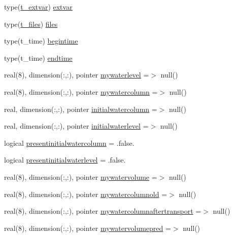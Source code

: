 \begin{DoxyCompactItemize}
type(\mbox{\hyperlink{structmodulerunoff_1_1t__extvar}{t\+\_\+extvar}}) \mbox{\hyperlink{structmodulerunoff_1_1t__runoff_af05a5e839c1777ba5d2ed3d274c3208d}{extvar}}
\item 
type(\mbox{\hyperlink{structmodulerunoff_1_1t__files}{t\+\_\+files}}) \mbox{\hyperlink{structmodulerunoff_1_1t__runoff_ad97641260220a205c0d92b64306e4716}{files}}
\item 
type(t\+\_\+time) \mbox{\hyperlink{structmodulerunoff_1_1t__runoff_ad63b86b7a4955d71f8768332a549eb9b}{begintime}}
\item 
type(t\+\_\+time) \mbox{\hyperlink{structmodulerunoff_1_1t__runoff_ab7944b49fbcee7c55e4aaea7f250e482}{endtime}}
\item 
real(8), dimension(\+:,\+:), pointer \mbox{\hyperlink{structmodulerunoff_1_1t__runoff_af3b7115fe53d1fea0d67d5d3d08f63f2}{mywaterlevel}} =$>$ null()
\item 
real(8), dimension(\+:,\+:), pointer \mbox{\hyperlink{structmodulerunoff_1_1t__runoff_ab85865148efbf8f25b94660f422fb080}{mywatercolumn}} =$>$ null()
\item 
real, dimension(\+:,\+:), pointer \mbox{\hyperlink{structmodulerunoff_1_1t__runoff_aba50fc74a85dcc5592e658b0eb328317}{initialwatercolumn}} =$>$ null()
\item 
real, dimension(\+:,\+:), pointer \mbox{\hyperlink{structmodulerunoff_1_1t__runoff_aef7bbff6b1506db3c8c6d8b88483c130}{initialwaterlevel}} =$>$ null()
\item 
logical \mbox{\hyperlink{structmodulerunoff_1_1t__runoff_a8f96148e9c17609f9bb15d856bc22c20}{presentinitialwatercolumn}} = .false.
\item 
logical \mbox{\hyperlink{structmodulerunoff_1_1t__runoff_ada46b93a7237e4c0336928eef6d4f233}{presentinitialwaterlevel}} = .false.
\item 
real(8), dimension(\+:,\+:), pointer \mbox{\hyperlink{structmodulerunoff_1_1t__runoff_a22e7a63e4b6518a1102af819e762213c}{mywatervolume}} =$>$ null()
\item 
real(8), dimension(\+:,\+:), pointer \mbox{\hyperlink{structmodulerunoff_1_1t__runoff_a55bf668047b96d66498c19ce954d921d}{mywatercolumnold}} =$>$ null()
\item 
real(8), dimension(\+:,\+:), pointer \mbox{\hyperlink{structmodulerunoff_1_1t__runoff_a55ac422280ea19b25857b8e73365604f}{mywatercolumnaftertransport}} =$>$ null()
\item 
real(8), dimension(\+:,\+:), pointer \mbox{\hyperlink{structmodulerunoff_1_1t__runoff_a04eb55b9fa44d46c6eb4092124b795fe}{mywatervolumepred}} =$>$ null()

\end{DoxyCompactItemize}
